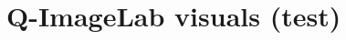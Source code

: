 \documentclass[11pt]{article}
\begin{document}
\section*{Q-ImageLab visuals (test)}

\end{document}
